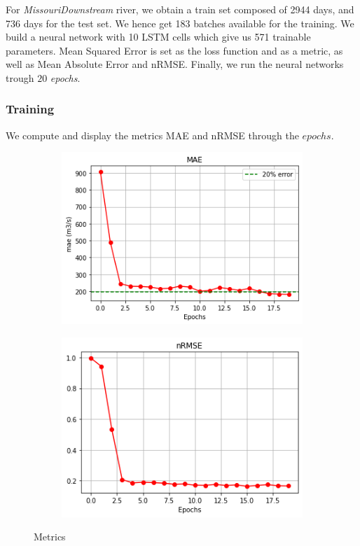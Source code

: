 For \textit{MissouriDownstream} river, we obtain a train set composed of 2944 days, and 736 days for the test set. We hence get 183 batches available for the training. We build a neural network with 10 LSTM cells which give us 571 trainable parameters. Mean Squared Error is set as the loss function and as a metric, as well as Mean Absolute Error and nRMSE. Finally, we run the neural networks trough $20$ \textit{epochs}. 




\subsubsection{Training}
We compute and display the metrics MAE and nRMSE through the $epochs$. 
\begin{figure}[H]
    \begin{subfigure}{0.45 \textwidth}
        \centering
        \includegraphics[scale = 0.5]{Graph/mae_lstm.png}
        \label{fig:my_label}
    \end{subfigure}
    \centering
     \begin{subfigure}{0.45 \textwidth}
         \centering
        \includegraphics[scale = 0.5]{Graph/nrmse_lstm.png}
        \label{fig:my_label}
     \end{subfigure}
     \caption{Metrics}
     
\end{figure}

